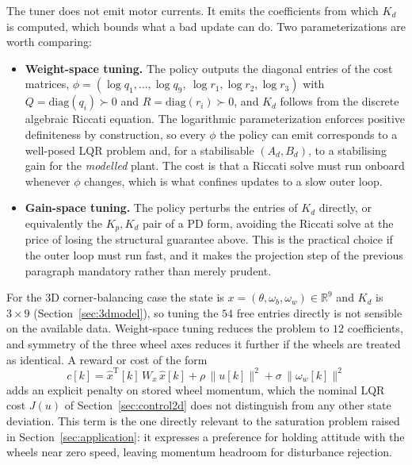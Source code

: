 The tuner does not emit motor currents. It emits the coefficients from which
$K_d$ is computed, which bounds what a bad update can do. Two
parameterizations are worth comparing:

\begin{itemize}
    \item \textbf{Weight-space tuning.} The policy outputs the diagonal
    entries of the cost matrices,
    $\phi = (\log q_1,\dots,\log q_9,\ \log r_1, \log r_2, \log r_3)$ with
    $Q = \mathrm{diag}(q_i) \succ 0$ and $R = \mathrm{diag}(r_i) \succ 0$, and
    $K_d$ follows from the discrete algebraic Riccati equation. The
    logarithmic parameterization enforces positive definiteness by
    construction, so every $\phi$ the policy can emit corresponds to a
    well-posed LQR problem and, for a stabilisable $(A_d,B_d)$, to a
    stabilising gain for the \emph{modelled} plant. The cost is that a Riccati
    solve must run onboard whenever $\phi$ changes, which is what confines
    updates to a slow outer loop.
    \item \textbf{Gain-space tuning.} The policy perturbs the entries of $K_d$
    directly, or equivalently the $K_p, K_d$ pair of a PD form, avoiding the
    Riccati solve at the price of losing the structural guarantee above. This
    is the practical choice if the outer loop must run fast, and it makes the
    projection step of the previous paragraph mandatory rather than merely
    prudent.
\end{itemize}

For the 3D corner-balancing case the state is
$x = (\theta, \omega_b, \omega_w) \in \mathbb{R}^9$ and $K_d$ is $3\times 9$
(Section~\ref{sec:3dmodel}), so tuning the $54$ free entries directly is not
sensible on the available data. Weight-space tuning reduces the problem to
$12$ coefficients, and symmetry of the three wheel axes reduces it further if
the wheels are treated as identical. A reward or cost of the form
\begin{equation}
c[k] = \hat x^{\mathrm T}[k]\,W_x\,\hat x[k] + \rho\,\|u[k]\|^2 + \sigma\,\|\omega_w[k]\|^2
\label{eq:tuner_cost}
\end{equation}
adds an explicit penalty on stored wheel momentum, which the nominal LQR cost
$J(u)$ of Section~\ref{sec:control2d} does not distinguish from any other
state deviation. This term is the one directly relevant to the saturation
problem raised in Section~\ref{sec:application}: it expresses a preference for
holding attitude with the wheels near zero speed, leaving momentum headroom
for disturbance rejection.

